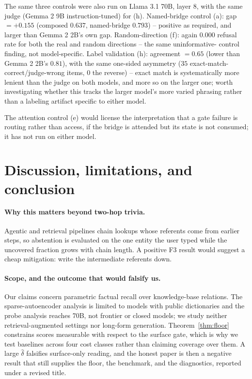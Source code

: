 \documentclass{article}
\begin{document}
The same three controls were also run on Llama 3.1 70B, layer 8, with the same judge
(Gemma 2 9B instruction-tuned) for (h). Named-bridge control (a): gap $=+0.155$ (composed $0.637$,
named-bridge $0.793$) -- positive as required, and larger than Gemma 2 2B's own gap. Random-direction
(f): again $0.000$ refusal rate for both the real and random directions -- the same uninformative-
control finding, not model-specific. Label validation (h): agreement $=0.65$ (lower than Gemma 2 2B's
$0.81$), with the same one-sided asymmetry ($35$ exact-match-correct/judge-wrong items, $0$ the
reverse) -- exact match is systematically more lenient than the judge on both models, and more so on
the larger one; worth investigating whether this tracks the larger model's more varied phrasing rather
than a labeling artifact specific to either model.

The attention control (e) would license the interpretation that a
gate failure is routing rather than access, if the bridge is attended but its state is not consumed;
it has not run on either model.

\section{Discussion, limitations, and conclusion}

\paragraph{Why this matters beyond two-hop trivia.} Agentic and retrieval pipelines chain lookups
whose referents come from earlier steps, so abstention is evaluated on the one entity the user typed
while the uncovered fraction grows with chain length. A positive F3 result would suggest a cheap
mitigation: write the intermediate referents down.

\paragraph{Scope, and the outcome that would falsify us.} Our claims concern parametric factual
recall over knowledge-base relations. The sparse-autoencoder analysis is limited to models with
public dictionaries and the probe analysis reaches 70B, not frontier or closed models; we study
neither retrieval-augmented settings nor long-form generation. Theorem~\ref{thm:floor} constrains
scores measurable with respect to the surface gate, which is why we test baselines across four cost
classes rather than claiming coverage over them. A large $\hat\delta$ falsifies surface-only reading, and the honest
paper is then a negative result that still supplies the floor, the benchmark, and the diagnostics,
reported under a revised title.
\end{document}
